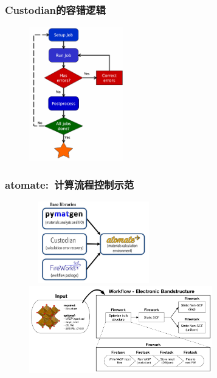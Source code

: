\documentclass[cjk,slidestop,compress,mathserif,blue]{beamer}
\begin{document}
\frame
{
	\frametitle{\textrm{Custodian}的容错逻辑}
\begin{figure}[h!]
\centering
\vspace*{-0.1in}
\includegraphics[height=2.3in]{Figures/MP_custodian.png}
\label{Custodian_over}
\caption{\fontsize{7.2pt}{4.2pt}}%
\end{figure} 
}

\frame
{
	\frametitle{\textrm{atomate}:~计算流程控制示范}
\begin{figure}[h!]
\centering
\vspace*{-0.19in}
\includegraphics[height=1.4in,width=2.2in,viewport=0 0 820 630,clip]{Figures/Atomate_comp.png}
\vskip 1pt
\includegraphics[height=1.5in]{Figures/bandstructure_wf.png}
\label{Logo_QM-MM}
\end{figure} 
}
\end{document}
